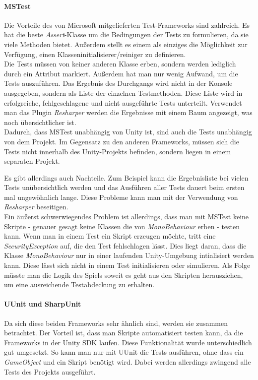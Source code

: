 \paragraph{MSTest} Die Vorteile des von Microsoft mitgelieferten Test-Frameworks sind zahlreich. Es hat die beste \textit{Assert}-Klasse um die Bedingungen der Tests zu formulieren, da sie viele Methoden bietet. Außerdem stellt es einem als einziges die Möglichkeit zur Verfügung, einen Klasseninitialisierer/reiniger zu definieren.\\
Die Tests müssen von keiner anderen Klasse erben, sondern werden lediglich durch ein Attribut markiert. Außerdem hat man nur wenig Aufwand, um die Tests auszuführen. Das Ergebnis des Durchgangs wird nicht in der Konsole ausgegeben, sondern als Liste der einzelnen Testmethoden. Diese Liste wird in erfolgreiche, fehlgeschlagene und nicht ausgeführte Tests unterteilt. Verwendet man das Plugin \textit{Resharper} werden die Ergebnisse mit einem Baum angezeigt, was noch übersichtlicher ist.\\
Dadurch, dass MSTest unabhängig von Unity ist, sind auch die Tests unabhängig von dem Projekt. Im Gegensatz zu den anderen Frameworks, müssen sich die Tests nicht innerhalb des Unity-Projekts befinden, sondern liegen in einem separaten Projekt.

Es gibt allerdings auch Nachteile. Zum Beispiel kann die Ergebnisliste bei vielen Tests unübersichtlich werden und das Ausführen aller Tests dauert beim ersten mal ungewöhnlich lange. Diese Probleme kann man mit der Verwendung von \textit{Resharper} beseitigen.\\
Ein äußerst schwerwiegendes Problem ist allerdings, dass man mit MSTest keine Skripte - genauer gesagt keine Klassen die von \textit{MonoBehaviour} erben - testen kann. Wenn man in einem Test ein Skript erzeugen möchte, tritt eine \textit{SecurityException} auf, die den Test fehlschlagen lässt. Dies liegt daran, dass die Klasse \textit{MonoBehaviour} nur in einer laufenden Unity-Umgebung intialisiert werden kann. Diese lässt sich nicht in einem Test initialisieren oder simulieren. Als Folge müsste man die Logik des Spiels soweit es geht aus den Skripten herausziehen, um eine ausreichende Testabdeckung zu erhalten.

\paragraph{UUnit und SharpUnit} Da sich diese beiden Frameworks sehr ähnlich sind, werden sie zusammen betrachtet. Der Vorteil ist, dass man Skripte automatisiert testen kann, da die Frameworks in der Unity SDK laufen. Diese Funktionalität wurde unterschiedlich gut umgesetzt. So kann man nur mit UUnit die Tests ausführen, ohne dass ein \textit{GameObject} und ein Skript benötigt wird. Dabei werden allerdings zwingend alle Tests des Projekts ausgeführt.

